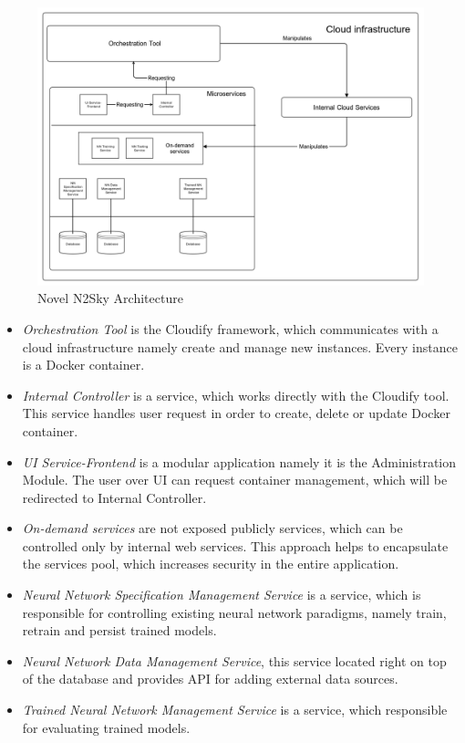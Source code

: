 \begin{figure}[H]
\begin{center}
  \includegraphics[width=\linewidth]{components/2/architecture.png}
  \caption{Novel N2Sky Architecture}
  \label{fig:newarch}
\end{center}
\end{figure}

\begin{itemize}
\item \emph{Orchestration Tool} is the Cloudify framework, which communicates with a cloud infrastructure namely create and manage new instances. Every instance is a Docker container.
\item \emph{Internal Controller} is a service, which works directly with the Cloudify tool. This service handles user request in order to create, delete or update Docker container.
\item \emph{UI Service-Frontend} is a modular application namely it is the Administration Module. The user over UI can request container management, which will be redirected to Internal Controller.
\item \emph{On-demand services} are not exposed publicly services, which can be controlled only by internal web services.  This approach helps to encapsulate the services pool, which increases security in the entire application. 
\item \emph{Neural Network Specification Management Service}  is a service, which is responsible for controlling existing neural network paradigms, namely train, retrain and persist trained models.
\item \emph{Neural Network Data Management Service}, this service located right on top of the database and provides API for adding external data sources.
\item \emph{Trained Neural Network Management Service} is a service, which responsible for evaluating trained models.
\end{itemize}



